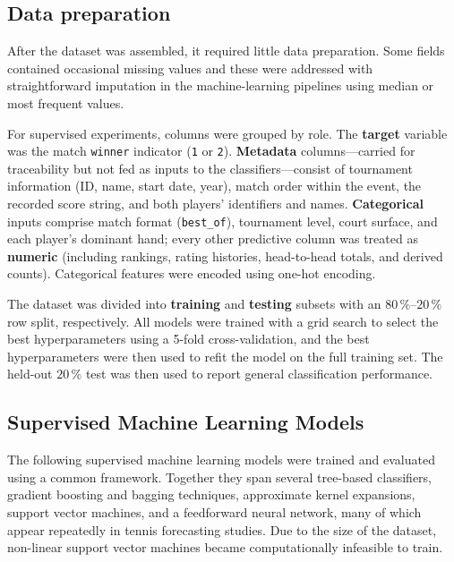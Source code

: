\subsection{Data preparation}
\label{sec:data-preparation}

After the dataset was assembled, it required little data preparation. Some fields contained
occasional missing values and
these were addressed with straightforward imputation in
the machine-learning pipelines using median or most frequent values.

For supervised experiments, columns were grouped by role. The \textbf{target} variable was the match
\texttt{winner} indicator (\texttt{1} or \texttt{2}). \textbf{Metadata} columns---carried for
traceability but not fed as inputs to the classifiers---consist of tournament information (ID,
name, start date, year), match order within the event, the recorded score string, and both players'
identifiers and names. \textbf{Categorical} inputs comprise match format (\texttt{best\_of}),
tournament level, court surface, and each player's dominant hand; every other predictive column was
treated as \textbf{numeric} (including rankings, rating histories, head-to-head totals, and derived
counts). Categorical features were encoded using one-hot encoding.

The dataset was divided into \textbf{training} and \textbf{testing} subsets with an
$80\,\%$--$20\,\%$ row split, respectively. All models were trained with a grid search to select the
best hyperparameters using a 5-fold cross-validation, and the best hyperparameters were then used to
refit the model on the full training set. The held-out $20\,\%$ test was then used to report general
classification performance.

\subsection{Supervised Machine Learning Models}
\label{sec:supervised-machine-learning-models}

The following supervised machine learning models were trained and evaluated using a common
framework. Together they span several tree-based classifiers, gradient boosting and bagging
techniques, approximate kernel expansions, support vector machines, and a feedforward neural
network, many of which appear repeatedly in tennis forecasting studies. Due to the size of the
dataset, non-linear support vector machines became computationally infeasible to train.

